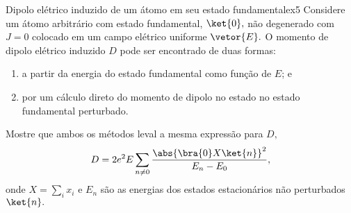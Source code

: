 \begin{exercício}{Dipolo elétrico induzido de um átomo em seu estado fundamental}{ex5}
   Considere um átomo arbitrário com estado fundamental, \(\ket{0},\) não degenerado com \(J = 0\) colocado em um campo elétrico uniforme \(\vetor{E}.\) O momento de dipolo elétrico induzido \(D\) pode ser encontrado de duas formas: 
   \begin{enumerate}[label=(\alph*)]
       \item a partir da energia do estado fundamental como função de \(E\); e
       \item por um cálculo direto do momento de dipolo no estado no estado fundamental perturbado.
   \end{enumerate}
   Mostre que ambos os métodos leval a mesma expressão para \(D,\)
   \begin{equation*}
      D = 2e^2 E \sum_{n \neq 0} \frac{\abs{\bra{0}X\ket{n}}^2}{E_n - E_0},
   \end{equation*}
   onde \(X = \sum_i x_i\) e \(E_n\) são as energias dos estados estacionários não perturbados \(\ket{n}.\)
\end{exercício}
